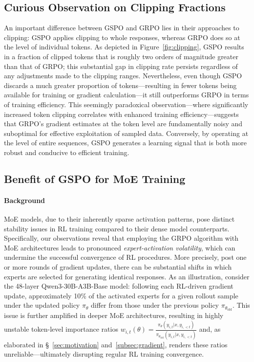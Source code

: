 \subsection{Curious Observation on Clipping Fractions}

An important difference between GSPO and GRPO lies in their approaches to clipping: GSPO applies clipping to whole responses, whereas GRPO does so at the level of individual tokens. As depicted in Figure~\ref{fig:clipping}, GSPO results in a fraction of clipped tokens that is roughly two orders of magnitude greater than that of GRPO; this substantial gap in clipping rate persists regardless of any adjustments made to the clipping ranges. Nevertheless, even though GSPO discards a much greater proportion of tokens—resulting in fewer tokens being available for training or gradient calculation—it still outperforms GRPO in terms of training efficiency. This seemingly paradoxical observation—where significantly increased token clipping correlates with enhanced training efficiency—suggests that GRPO’s gradient estimates at the token level are fundamentally noisy and suboptimal for effective exploitation of sampled data. Conversely, by operating at the level of entire sequences, GSPO generates a learning signal that is both more robust and conducive to efficient training.

\subsection{Benefit of GSPO for MoE Training}
\label{subsec:routing_replay}

\paragraph{Background}
MoE models, due to their inherently sparse activation patterns, pose distinct stability issues in RL training compared to their dense model counterparts. Specifically, our observations reveal that employing the GRPO algorithm with MoE architectures leads to pronounced \textit{expert-activation volatility}, which can undermine the successful convergence of RL procedures. More precisely, post one or more rounds of gradient updates, there can be substantial shifts in which experts are selected for generating identical responses. As an illustration, consider the 48-layer Qwen3-30B-A3B-Base model: following each RL-driven gradient update, approximately 10\% of the activated experts for a given rollout sample under the updated policy $\pi_{\theta}$ differ from those under the previous policy $\pi_{\theta_\text{old}}$. This issue is further amplified in deeper MoE architectures, resulting in highly unstable token-level importance ratios $w_{i,t}(\theta) = \frac{ \pi_{\theta} (y_{i,t} | x, y_{i,<t}) }{ \pi_{\theta_\text{old}} (y_{i,t} | x,y_{i,<t})}$ and, as elaborated in \S~\ref{sec:motivation} and~\ref{subsec:gradient}, renders these ratios unreliable—ultimately disrupting regular RL training convergence.

